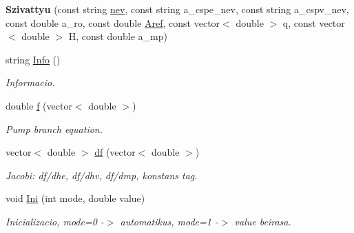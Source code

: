 \begin{DoxyCompactItemize}
\item 
\mbox{\label{class_szivattyu_aea7d1a77b34e471145a856483915369f}} 
{\bfseries Szivattyu} (const string \hyperlink{class_agelem_abe92b7e3912367d5d1caf6b277ca0b7d}{nev}, const string a\+\_\+cspe\+\_\+nev, const string a\+\_\+cspv\+\_\+nev, const double a\+\_\+ro, const double \hyperlink{class_agelem_a3f8668febc2958fd539997d537552f17}{Aref}, const vector$<$ double $>$ q, const vector$<$ double $>$ H, const double a\+\_\+mp)
\item 
\mbox{\label{class_szivattyu_a369c5e45b9381265feeba29d06bd1e59}} 
string \hyperlink{class_szivattyu_a369c5e45b9381265feeba29d06bd1e59}{Info} ()
\begin{DoxyCompactList}\small\item\em Informacio. \end{DoxyCompactList}\item 
double \hyperlink{class_szivattyu_a083379e0cee2db17f1b20db3fdfcde79}{f} (vector$<$ double $>$)
\begin{DoxyCompactList}\small\item\em Pump branch equation. \end{DoxyCompactList}\item 
\mbox{\label{class_szivattyu_aefd62e0f02d12273d34511e4b8721f04}} 
vector$<$ double $>$ \hyperlink{class_szivattyu_aefd62e0f02d12273d34511e4b8721f04}{df} (vector$<$ double $>$)
\begin{DoxyCompactList}\small\item\em Jacobi\+: df/dhe, df/dhv, df/dmp, konstans tag. \end{DoxyCompactList}\item 
\mbox{\label{class_szivattyu_a3c35ef43a38a45e9d077281a8804abe4}} 
void \hyperlink{class_szivattyu_a3c35ef43a38a45e9d077281a8804abe4}{Ini} (int mode, double value)
\begin{DoxyCompactList}\small\item\em Inicializacio, mode=0 -\/$>$ automatikus, mode=1 -\/$>$ value beirasa. \end{DoxyCompactList}\item 
\mbox{\label{class_szivattyu_aae9b66e4fc0313360d1b8a65ba0a2a68}} 

\end{DoxyCompactItemize}
